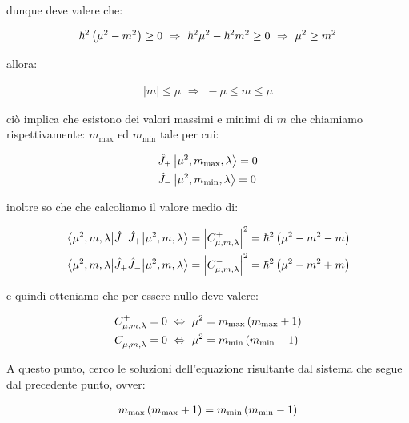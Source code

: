 	dunque deve valere che:
	
\begin{align*}
	\hbar^2 \, \qty(\mu^2 - m^2)  \geq 0  \, \, \Rightarrow \, \, \hbar^2 \mu^2 - \hbar^2 m^2 \geq 0 \, \, \Rightarrow \, \, \mu^2 \geq m^2
\end{align*}

	allora:
	
\begin{align*}
	|m| \leq \mu \,\, \Rightarrow \,\, -\mu \leq m \leq \mu
\end{align*}

	ciò implica che esistono dei valori massimi e minimi di $m$ che chiamiamo rispettivamente: $m_{\text{max}}$ ed $m_{\text{min}}$ tale per cui:

\begin{nb}
\begin{align*}
	& \hat{J}_+ \ket{\mu^2, m_{\text{max}}, \lambda} = 0 \\
	& \hat{J}_- \ket{\mu^2, m_{\text{min}}, \lambda} = 0 
\end{align*}
\end{nb}

	inoltre so che che calcoliamo il valore medio di:
	
\begin{align*}
	& \mel{\mu^2, m, \lambda}{\hat{J}_-\hat{J}_+}{\mu^2, m, \lambda} = \abs{C^+_{\mu, m, \lambda}}^2 = \hbar^2 \, \qty(\mu^2 - m^2 - m) \\
	& \mel{\mu^2, m, \lambda}{\hat{J}_+ \hat{J}_-}{\mu^2, m, \lambda} = \abs{C^-_{\mu, m, \lambda}}^2 = \hbar^2 \, \qty(\mu^2 - m^2 + m)
\end{align*}

	e quindi otteniamo che per essere nullo deve valere:
	
\begin{align*}
	& C^+_{\mu, m, \lambda} = 0  \, \, \Leftrightarrow \,\, \mu^2 = m_{\text{max}} \, \qty(m_{\text{max}} + 1) \\
	&  C^-_{\mu, m, \lambda} = 0  \, \, \Leftrightarrow \,\, \mu^2 = m_{\text{min}} \, \qty(m_{\text{min}} - 1)
\end{align*}

	A questo punto, cerco le soluzioni dell'equazione risultante dal sistema che segue dal precedente punto, ovver:
	
\begin{align*}
	m_{\text{max}} \, \qty( m_{\text{max}} +1 ) = m_{\text{min}} \, \qty( m_{\text{min}} - 1 ) 
\end{align*}

